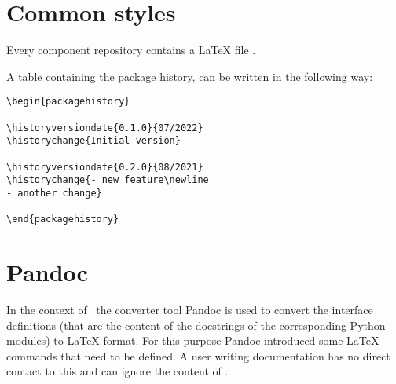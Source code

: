 \documentclass[a4paper,10pt]{report}
\begin{document}

\chapter{Common styles}

Every component repository contains a LaTeX file .

A table containing the package history, can be written in the following way:

\begin{verbatim}
\begin{packagehistory}

\historyversiondate{0.1.0}{07/2022}
\historychange{Initial version}

\historyversiondate{0.2.0}{08/2021}
\historychange{- new feature\newline
- another change}

\end{packagehistory}
\end{verbatim}

\begin{packagehistory}



\end{packagehistory}


\chapter{Pandoc}

In the context of \rfw\ the converter tool Pandoc is used to convert the interface definitions (that are the content of the docstrings of the corresponding
Python modules) to LaTeX format. For this purpose Pandoc introduced some LaTeX commands that need to be defined. A user writing documentation has no direct
contact to this and can ignore the content of .

\end{document}
